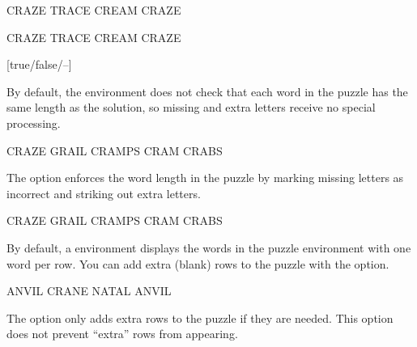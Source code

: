 \documentclass[svgnames]{report}
\begin{document}
  \begin{example}
    \begin{wordle}[letters]{CRAZE} %
      TRACE
      CREAM
      CRAZE
    \end{wordle}
  \end{example}

  \begin{example}
    \begin{wordle}[noletters]{CRAZE}
      TRACE
      CREAM
      CRAZE
    \end{wordle}
  \end{example}

  [true/false/--]

  By default, the  environment does not check that each
  word in the puzzle has the same length as the solution, so missing
  and extra letters receive no special processing.

  \begin{example}
    \begin{wordle}[strict=false]{CRAZE} %
      GRAIL
      CRAMPS
      CRAM
      CRABS
    \end{wordle}
  \end{example}

  The  option enforces the word length in the puzzle by
  marking missing letters as incorrect and striking out extra letters.

  \begin{example}
    \begin{wordle}[strict]{CRAZE}
      GRAIL
      CRAMPS
      CRAM
      CRABS
    \end{wordle}
  \end{example}


  By default, a  environment displays the words
  in the puzzle environment with one word per row. You can add extra
  (blank) rows to the puzzle with the  option.

  \begin{example}
    \begin{wordle}[rows=4]{ANVIL}
      CRANE
      NATAL
      ANVIL
    \end{wordle}
  \end{example}

  The  option only adds extra rows to the puzzle if they
  are needed. This option does not prevent ``extra'' rows from
  appearing.
\end{document}
